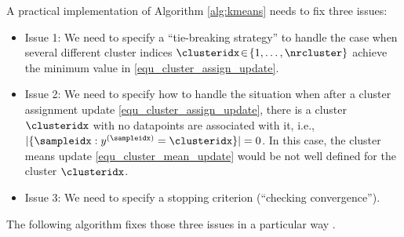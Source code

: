 \documentclass[12pt]{report}
\begin{document}
A practical implementation of Algorithm \ref{alg:kmeans} needs to fix three issues: 
\begin{itemize} 
\item Issue 1: We need to specify a ``tie-breaking strategy'' to 
handle the case when several different cluster indices 
$\clusteridx\!\in\!\{1,\ldots,\nrcluster\}$ achieve the minimum 
value in \eqref{equ_cluster_assign_update}. 
\item Issue 2: We need to specify how to handle the situation 
when after a cluster assignment update  \eqref{equ_cluster_assign_update}, 
there is a cluster $\clusteridx$ with no datapoints are associated 
with it, i.e., $|\{ \sampleidx: y^{(\sampleidx)} = \clusteridx \}|=0$. 
In this case, the cluster means update \eqref{equ_cluster_mean_update} 
would be not well defined for the cluster $\clusteridx$. 
\item Issue 3: We need to specify a stopping criterion (``checking convergence''). 
\end{itemize}
The following algorithm fixes those three issues in a particular way \cite{Gray1980}.  
\end{document}
